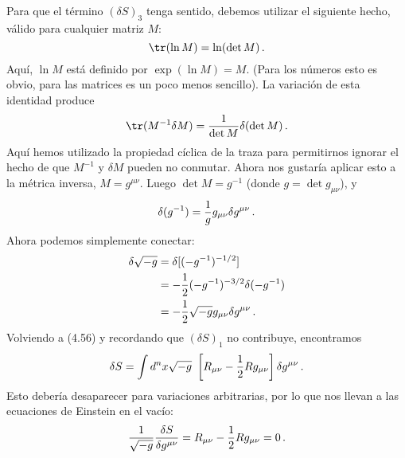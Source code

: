 \documentclass[11pt,b5paper,openany,twoside]{book}
\newcommand{\mn}{{\mu\nu}}
\def\g{{\sqrt{-g}}}
\begin{document}
Para que el término $(\delta S)_3$ tenga sentido, debemos utilizar el siguiente hecho, válido para cualquier matriz $M$:
\begin{equation}
\tr(\ln M) = \ln(\det M)\,.\label{4.62}
\end{equation}
Aquí, $\ln M$ está definido por $\exp(\ln M)=M$.
(Para los números esto es obvio, para las matrices es un poco menos sencillo).
La variación de esta identidad produce
\begin{equation}
\tr(M^{-1} \delta M) = {1\over{\det M}}\delta(\det M)\,.\label{4.63}
\end{equation}
Aquí hemos utilizado la propiedad cíclica de la traza para permitirnos ignorar el hecho de que $M^{-1}$ y $\delta M$ pueden no conmutar.
Ahora nos gustaría aplicar esto a la métrica inversa, $M = g^\mn$.
Luego $\det M=g^{-1}$ (donde $g=\det g_{\mn}$), y
\begin{equation}
\delta(g^{-1})={1\over g}g_\mn \delta g^\mn\,.\label{4.64}
\end{equation}
Ahora podemos simplemente conectar:
\begin{align}
\delta\g  &=  \delta[(-g^{-1})^{-1/2}] \notag \\
&=  -{1\over 2}(-g^{-1})^{-3/2}\delta(-g^{-1}) \notag \\
&=  -{1\over 2}\g g_\mn \delta g^\mn\,. \label{4.65}
\end{align}
Volviendo a (4.56) y recordando que $(\delta S)_1$ no contribuye, encontramos
\begin{equation}
\delta S = \int d^nx \g ~\left[R_{\mn} -{1\over 2} Rg_\mn\right]
\delta g^\mn\,.\label{4.66}
\end{equation}
Esto debería desaparecer para variaciones arbitrarias, por lo que nos llevan a las ecuaciones de Einstein en el vacío:
\begin{equation}
{1\over{\g}}{{\delta S}\over{\delta g^\mn}}
=R_{\mn} -{1\over 2} Rg_\mn =0\,.\label{4.67}
\end{equation}
\end{document}
